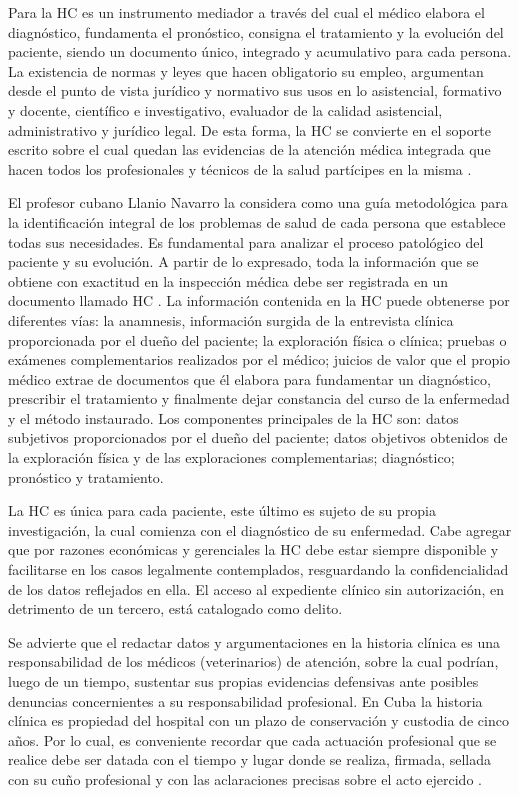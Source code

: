 Para  la HC es un instrumento mediador a través del cual el médico elabora el diagnóstico, fundamenta el pronóstico, consigna el tratamiento y la evolución del paciente, siendo un documento único, integrado y acumulativo para cada persona. La existencia de normas y leyes que hacen obligatorio su empleo, argumentan desde el punto de vista jurídico y normativo sus usos en lo asistencial, formativo y docente, científico e investigativo, evaluador de la calidad asistencial, administrativo y jurídico legal. De esta forma, la HC se convierte en el soporte escrito sobre el cual quedan las evidencias de la atención médica integrada que hacen todos los profesionales y técnicos de la salud partícipes en la misma . 

El profesor cubano Llanio Navarro la considera como una guía metodológica para la identificación integral de los problemas de salud de cada persona que establece todas sus necesidades. Es fundamental para analizar el proceso patológico del paciente y su evolución. A partir de lo expresado, toda la información que se obtiene con exactitud en la inspección médica debe ser registrada en un documento llamado HC . La información contenida en la HC puede obtenerse por diferentes vías: la anamnesis, información surgida de la entrevista clínica proporcionada por el dueño del paciente; la exploración física o clínica; pruebas o exámenes complementarios realizados por el médico; juicios de valor que el propio médico extrae de documentos que él elabora para fundamentar un diagnóstico, prescribir el tratamiento y finalmente dejar constancia del curso de la enfermedad y el método instaurado. Los componentes principales de la HC son: datos subjetivos proporcionados por el dueño del paciente; datos objetivos obtenidos de la exploración física y de las exploraciones complementarias; diagnóstico; pronóstico y tratamiento.    

La HC es única para cada paciente, este último es sujeto de su propia investigación, la cual comienza con el diagnóstico de su enfermedad. Cabe agregar que por razones económicas y gerenciales la HC debe estar siempre disponible y facilitarse en los casos legalmente contemplados, resguardando la confidencialidad de los datos reflejados en ella. El acceso al expediente clínico sin autorización, en detrimento de un tercero, está catalogado como delito.

Se advierte que el redactar datos y argumentaciones en la historia clínica es una responsabilidad de los médicos (veterinarios) de atención, sobre la cual podrían, luego de un tiempo, sustentar sus propias evidencias defensivas ante posibles denuncias concernientes a su responsabilidad profesional. En Cuba la historia clínica es propiedad del hospital con un plazo de conservación y custodia de cinco años. Por lo cual, es conveniente recordar que cada actuación profesional que se realice debe ser datada con el tiempo y lugar donde se realiza, firmada, sellada con su cuño profesional y con las aclaraciones precisas sobre el acto ejercido   .

